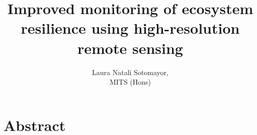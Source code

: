 \documentclass{thesis}
\title{Improved monitoring of ecosystem resilience using high-resolution remote sensing}
\author{Laura Natali Sotomayor, \\
MITS (Hons)}
\begin{document}
\maketitle
 
\section*{Abstract}




\end{document}
